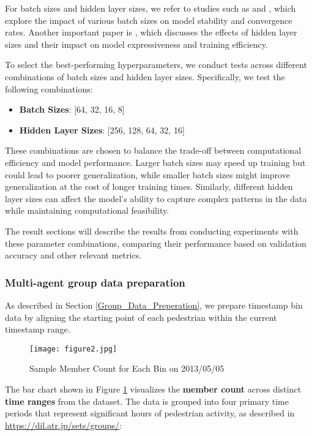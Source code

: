 \documentclass{article}
\begin{document}
For batch sizes and hidden layer sizes, we refer to studies such as \cite{deepsurrogate} and \cite{batchsizepaper}, which explore the impact of various batch sizes on model stability and convergence rates. Another important paper is \cite{hiddenlayers}, which discusses the effects of hidden layer sizes and their impact on model expressiveness and training efficiency.

To select the best-performing hyperparameters, we conduct tests across different combinations of batch sizes and hidden layer sizes. Specifically, we test the following combinations:
\begin{itemize}
    \item \textbf{Batch Sizes}: [64, 32, 16, 8]
    \item \textbf{Hidden Layer Sizes}: [256, 128, 64, 32, 16]
\end{itemize}

These combinations are chosen to balance the trade-off between computational efficiency and model performance. Larger batch sizes may speed up training but could lead to poorer generalization, while smaller batch sizes might improve generalization at the cost of longer training times. Similarly, different hidden layer sizes can affect the model's ability to capture complex patterns in the data while maintaining computational feasibility.

The result sections will describe the results from conducting experiments with these parameter combinations, comparing their performance based on validation accuracy and other relevant metrics.


\subsubsection{Multi-agent group data preparation}

As described in Section \ref{Group_Data_Preperation}, we prepare timestamp bin data by aligning the starting point of each pedestrian within the current timestamp range. 


\begin{figure}[H] 
    \centering
    \ifpdf
        \texttt{[image: figure2.jpg]}  %
    \fi
    \caption{Sample Member Count for Each Bin on 2013/05/05}
    \label{fig:member_count_chart}
\end{figure}

The bar chart shown in Figure \ref{fig:member_count_chart} visualizes the \textbf{member count} across distinct \textbf{time ranges} from the dataset. The data is grouped into four primary time periods that represent significant hours of pedestrian activity, as described in \url{https://dil.atr.jp/sets/groups/}:
\end{document}
